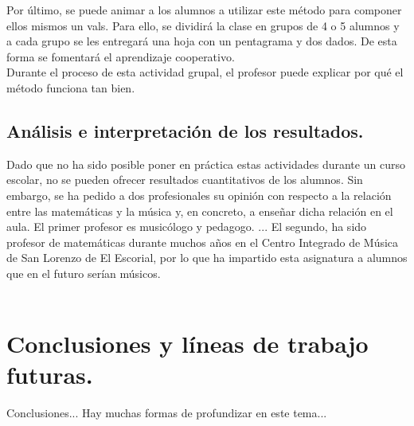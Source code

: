 \documentclass[a4paper, openright, 11pt, titlepage]{report}
\theoremstyle{definition}\newtheorem{defin}[propo]{Definition}
\theoremstyle{definition}\newtheorem{obser}[propo]{Remark}
\theoremstyle{definition}\newtheorem{ejem}[propo]{Ejemplo}
\theoremstyle{definition}\newtheorem{algoritmo}[propo]{Algoritmo}
\begin{document}
Por último, se puede animar a los alumnos a utilizar este método para componer ellos mismos un vals. Para ello, se dividirá la clase en grupos de 4 o 5 alumnos y a cada grupo se les entregará una hoja con un pentagrama y dos dados. De esta forma se fomentará el aprendizaje cooperativo.\\
Durante el proceso de esta actividad grupal, el profesor puede explicar por qué el método funciona tan bien.  

\section{Análisis e interpretación de los resultados.}
Dado que no ha sido posible poner en práctica estas actividades durante un curso escolar, no se pueden ofrecer resultados cuantitativos de los alumnos. Sin embargo, se ha pedido a dos profesionales su opinión con respecto a la relación entre las matemáticas y la música y, en concreto, a enseñar dicha relación en el aula. 
El primer profesor es musicólogo y pedagogo. ... 
El segundo, ha sido profesor de matemáticas durante muchos años en el Centro Integrado de Música de San Lorenzo de El Escorial, por lo que ha impartido esta asignatura a alumnos que en el futuro serían músicos.\\\\

\chapter{Conclusiones y líneas de trabajo futuras.}
Conclusiones...
Hay muchas formas de profundizar en este tema... 
\newpage
\appendix
\end{document}
